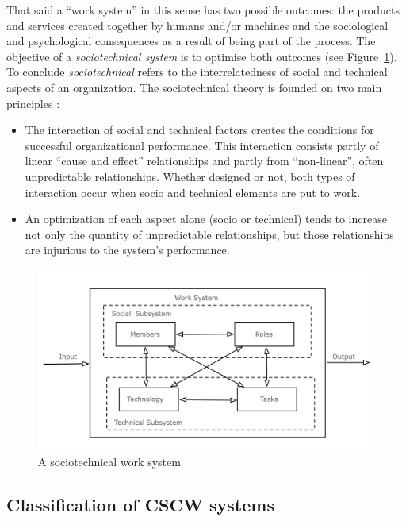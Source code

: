 That said a ``work system'' in this sense has two possible outcomes: the products and services created together by humans and/or machines and the sociological and psychological consequences as a result of being part of the process. The objective of a \emph{sociotechnical system} is to optimise both outcomes (see Figure~\ref{fig:images_sociotechnical_system}). To conclude \emph{sociotechnical} refers to the interrelatedness of social and technical aspects of an organization. The sociotechnical theory is founded on two main principles \citep{Koch2008}: \@

\begin{itemize}
  \item The interaction of social and technical factors creates the conditions for successful organizational performance. This interaction consists partly of linear ``cause and effect'' relationships and partly from ``non-linear'', often unpredictable relationships. Whether designed or not, both types of interaction occur when socio and technical elements are put to work.
  \item An optimization of each aspect alone (socio or technical) tends to increase not only the quantity of unpredictable relationships, but those relationships are injurious to the system's performance.
\end{itemize}

\begin{figure}[H]
 \centering
 \includegraphics[width=0.9\columnwidth]{images/sociotechnical_system.png}
 \caption[A sociotechnical work system]{A sociotechnical work system \citep{xx}}
\label{fig:images_sociotechnical_system}
\end{figure}


\subsection{Classification of \gls{CSCW} systems}
\label{sec:cscw_types}

